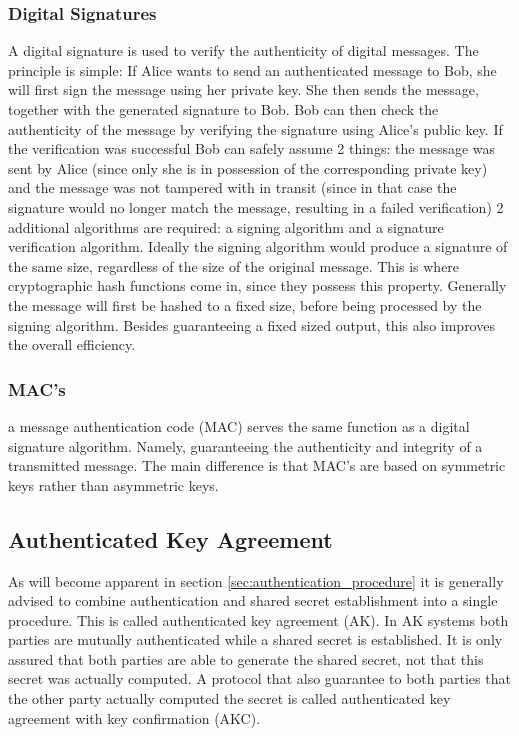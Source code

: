 \documentclass[master=cws,masteroption=vs,english]{kulemt}
\begin{document}
\subsubsection{Digital Signatures} A digital signature is used to verify the authenticity of digital messages. The principle is simple: If Alice wants to send an authenticated message to Bob, she will first sign the message using her private key. She then sends the message, together with the generated signature to Bob. Bob can then check the authenticity of the message by verifying the signature using Alice's public key. If the verification was successful Bob can safely assume 2 things: the message was sent by Alice (since only she is in possession of the corresponding private key) and the message was not tampered with in transit (since in that case the signature would no longer match the message, resulting in a failed verification) 2 additional algorithms are required: a signing algorithm and a signature verification algorithm. Ideally the signing algorithm would produce a signature of the same size, regardless of the size of the original message. This is where cryptographic hash functions come in, since they possess this property. Generally the message will first be hashed to a fixed size, before being processed by the signing algorithm. Besides guaranteeing a fixed sized output, this also improves the overall efficiency.\cite{wiki:DigitalSignature}

\subsubsection{MAC's} 
\label{sec:MAC}
a message authentication code (MAC) serves the same function as a digital signature algorithm. Namely, guaranteeing the authenticity and integrity of a transmitted message. The main difference is that MAC's are based on symmetric keys rather than asymmetric keys. 

\subsection{Authenticated Key Agreement}
\label{sec:AK}

As will become apparent in section \ref{sec:authentication_procedure} it is generally advised to combine authentication and shared secret establishment into a single procedure. This is called authenticated key agreement (AK). In AK systems both parties are mutually authenticated while a shared secret is established. It is only assured that both parties are able to generate the shared secret, not that this secret was actually computed. A protocol that also guarantee to both parties that the other party actually computed the secret is called authenticated key agreement with key confirmation (AKC).\cite{Blake-Wilson}
\end{document}

